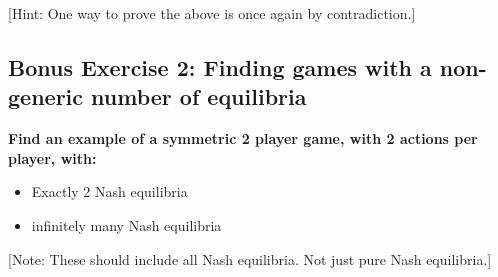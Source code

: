 \documentclass[10pt]{article}
\begin{document}
[Hint: One way to prove the above is once again by contradiction.]

\subsection*{Bonus Exercise 2: Finding games with a non-generic number of equilibria}

\textbf{Find an example of a symmetric 2 player game, with 2 actions per player, with:}

\begin{itemize}
    \item Exactly 2 Nash equilibria
    \item infinitely many Nash equilibria
\end{itemize}

[Note: These should include all Nash equilibria. Not just pure Nash equilibria.]
\end{document}
